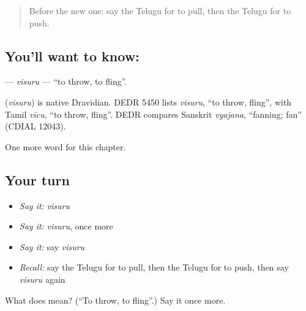\label{lesson:TE-C240-visuru}



\begin{quote}
Before the new one: say the Telugu for to pull, then the Telugu for to push.
\end{quote}

\subsection*{You'll want to know: }
\textbf{} — \emph{visuru} — \textquotedblleft{}to throw, to fling\textquotedblright{}.

\begin{cousinweb}
\textbf{} (\emph{visuru}) is native Dravidian. DEDR 5450 lists \emph{visuru}, \textquotedblleft{}to throw, fling\textquotedblright{}, with Tamil \emph{vīcu}, \textquotedblleft{}to throw, fling\textquotedblright{}. DEDR compares Sanskrit \emph{vyajana}, \textquotedblleft{}fanning; fan\textquotedblright{} (CDIAL 12043).
\end{cousinweb}

\begin{grammarlens}[title={What you've built}]
One more word for this chapter.
\end{grammarlens}

\subsection*{Your turn}
\begin{itemize}
\raggedright
  \item \emph{Say it:} \emph{visuru}
  \item \emph{Say it:} \emph{visuru}, once more
  \item \emph{Say it:} say \emph{visuru}
  \item \emph{Recall:} say the Telugu for to pull, then the Telugu for to push, then say \emph{visuru} again
\end{itemize}

\begin{tcolorbox}[breakable,colback=teal!4,colframe=teal!35!black,title={Before you move on}]
What does  mean? (\textquotedblleft{}To throw, to fling\textquotedblright{}.) Say it once more.
\end{tcolorbox}
